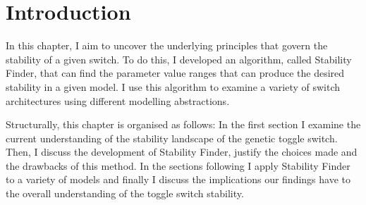 \section{Introduction}

In this chapter, I aim to uncover the underlying principles that govern the stability of a given switch. To do this, I developed an algorithm, called Stability Finder, that can find the parameter value ranges that can produce the desired stability in a given model. I use this algorithm to examine a variety of switch architectures using different modelling abstractions.

Structurally, this chapter is organised as follows: In the first section I examine the current understanding of the stability landscape of the genetic toggle switch. Then, I discuss the development of Stability Finder, justify the choices made and the drawbacks of this method. In the sections following I apply Stability Finder to a variety of models and finally I discuss the implications our findings have to the overall understanding of the toggle switch stability. 

